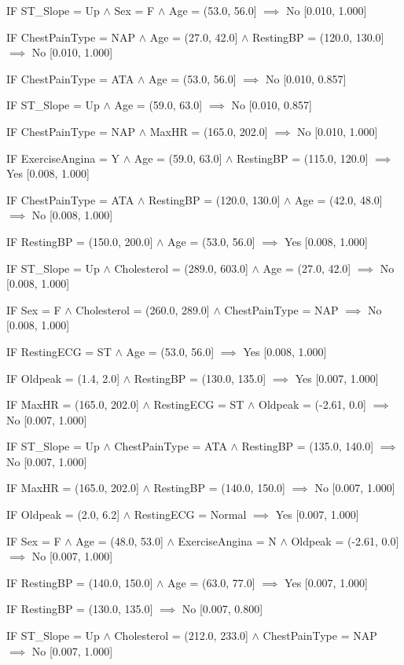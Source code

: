 IF ST\_Slope = Up $\land$ Sex = F $\land$ Age = (53.0, 56.0] $\implies$ No [0.010, 1.000]

IF ChestPainType = NAP $\land$ Age = (27.0, 42.0] $\land$ RestingBP = (120.0, 130.0] $\implies$ No [0.010, 1.000]

IF ChestPainType = ATA $\land$ Age = (53.0, 56.0] $\implies$ No [0.010, 0.857]

IF ST\_Slope = Up $\land$ Age = (59.0, 63.0] $\implies$ No [0.010, 0.857]

IF ChestPainType = NAP $\land$ MaxHR = (165.0, 202.0] $\implies$ No [0.010, 1.000]

IF ExerciseAngina = Y $\land$ Age = (59.0, 63.0] $\land$ RestingBP = (115.0, 120.0] $\implies$ Yes [0.008, 1.000]

IF ChestPainType = ATA $\land$ RestingBP = (120.0, 130.0] $\land$ Age = (42.0, 48.0] $\implies$ No [0.008, 1.000]

IF RestingBP = (150.0, 200.0] $\land$ Age = (53.0, 56.0] $\implies$ Yes [0.008, 1.000]

IF ST\_Slope = Up $\land$ Cholesterol = (289.0, 603.0] $\land$ Age = (27.0, 42.0] $\implies$ No [0.008, 1.000]

IF Sex = F $\land$ Cholesterol = (260.0, 289.0] $\land$ ChestPainType = NAP $\implies$ No [0.008, 1.000]

IF RestingECG = ST $\land$ Age = (53.0, 56.0] $\implies$ Yes [0.008, 1.000]

IF Oldpeak = (1.4, 2.0] $\land$ RestingBP = (130.0, 135.0] $\implies$ Yes [0.007, 1.000]

IF MaxHR = (165.0, 202.0] $\land$ RestingECG = ST $\land$ Oldpeak = (-2.61, 0.0] $\implies$ No [0.007, 1.000]

IF ST\_Slope = Up $\land$ ChestPainType = ATA $\land$ RestingBP = (135.0, 140.0] $\implies$ No [0.007, 1.000]

IF MaxHR = (165.0, 202.0] $\land$ RestingBP = (140.0, 150.0] $\implies$ No [0.007, 1.000]

IF Oldpeak = (2.0, 6.2] $\land$ RestingECG = Normal $\implies$ Yes [0.007, 1.000]

IF Sex = F $\land$ Age = (48.0, 53.0] $\land$ ExerciseAngina = N $\land$ Oldpeak = (-2.61, 0.0] $\implies$ No [0.007, 1.000]

IF RestingBP = (140.0, 150.0] $\land$ Age = (63.0, 77.0] $\implies$ Yes [0.007, 1.000]

IF RestingBP = (130.0, 135.0] $\implies$ No [0.007, 0.800]

IF ST\_Slope = Up $\land$ Cholesterol = (212.0, 233.0] $\land$ ChestPainType = NAP $\implies$ No [0.007, 1.000]


